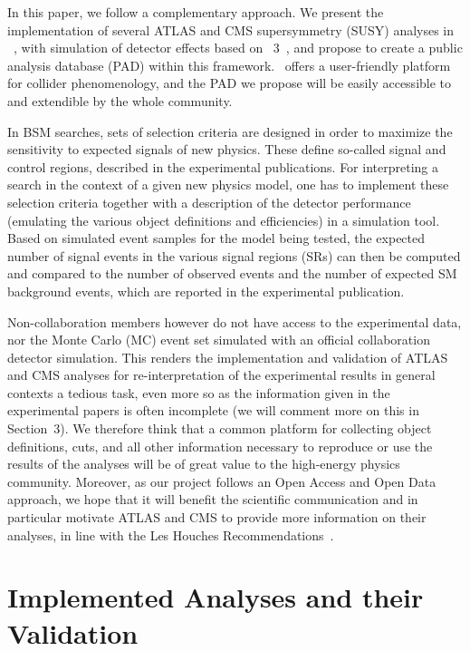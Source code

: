 In this paper, we follow a complementary approach. We present the implementation  
of several  ATLAS and CMS supersymmetry (SUSY) analyses in \ma~\cite{Conte:2012fm,Conte:2014zja}, 
with simulation of detector effects based on \delphes~3~\cite{deFavereau:2013fsa}, 
and propose to create a public analysis database (PAD) within this framework. 
\ma\ offers a user-friendly platform for collider phenomenology, 
and the PAD we propose will be easily accessible to and extendible by the whole community.

In BSM searches, sets of selection criteria are designed in order to maximize the sensitivity to expected signals of new physics. These define so-called signal and control regions, described in the experimental publications. 
For interpreting a search in the context of a given new physics model, one has to implement these selection criteria together with a description of the detector performance (emulating the various object definitions and efficiencies) in a simulation tool. 
Based on simulated event samples for the model being tested,  the expected number of signal events  in the various signal regions (SRs) can then be computed and compared to the number of observed events and the number of expected SM background events, which are reported in the experimental publication.  

Non-collaboration members however do not have access to the experimental data, nor the Monte Carlo (MC) event set 
simulated with an official collaboration detector simulation. This renders the implementation and validation 
of ATLAS and CMS analyses for re-interpretation of the experimental results in general contexts 
a tedious task, even more so as the information given in the experimental papers is often incomplete (we will comment more on this in Section~3).  
We therefore think that a common platform for collecting object definitions, cuts, and all other information 
necessary to reproduce or use the results of the analyses will be of great value to the high-energy physics community.  
Moreover, as our project follows an Open Access and Open Data approach, we hope that it will benefit the 
scientific communication and in particular motivate ATLAS and CMS to provide more information 
on their analyses, in line with the Les Houches Recommendations~\cite{Kraml:2012sg}.



\section{Implemented Analyses and their Validation}\label{sec:implemended}

